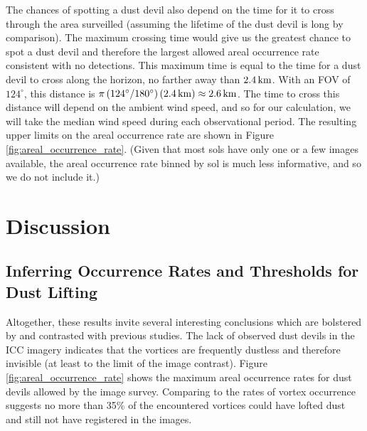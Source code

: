 \documentclass[linenumbers,trackchanges]{aastex63}
\begin{document}
The chances of spotting a dust devil also depend on the time for it to cross through the area surveilled (assuming the lifetime of the dust devil is long by comparison). The maximum crossing time would give us the greatest chance to spot a dust devil and therefore the largest allowed areal occurrence rate consistent with no detections. This maximum time is equal to the time for a dust devil to cross along the horizon, no farther away than $2.4\,{\rm km}$. With an FOV of $124^\circ$, this distance is $\pi \left(124^\circ/180^\circ\right) \left( 2.4\,{\rm km} \right) \approx 2.6\,{\rm km}$. The time to cross this distance will depend on the ambient wind speed, and so for our calculation, we will take the median wind speed during each observational period. The resulting upper limits on the areal occurrence rate are shown in Figure \ref{fig:areal_occurrence_rate}. (Given that most sols have only one or a few images available, the areal occurrence rate binned by sol is much less informative, and so we do not include it.) 

\section{Discussion}
\label{sec:Discussion}

\subsection{Inferring Occurrence Rates and Thresholds for Dust Lifting}
\label{sec:Inferring Occurrence Rates and Thresholds for Dust Lifting}

Altogether, these results invite several interesting conclusions which are bolstered by and contrasted with previous studies. The lack of observed dust devils in the ICC imagery indicates that the  vortices  are frequently dustless and therefore invisible (at least to the limit of the image contrast). Figure \ref{fig:areal_occurrence_rate} shows the maximum areal occurrence rates for dust devils allowed by the image survey. Comparing to the rates of vortex occurrence suggests no more than 35\% of the encountered vortices could have lofted dust and still not have registered in the images. 
\end{document}
